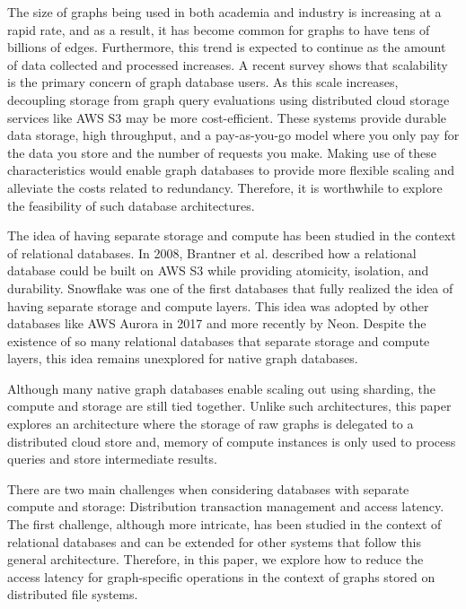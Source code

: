 The size of graphs being used in both academia and industry is increasing at a
rapid rate, and as a result, it has become common for graphs to have tens of
billions of edges\cite{sahu2017ubiquity}. Furthermore, this trend is expected to
continue as the amount of data collected and processed increases. A recent
survey shows that scalability is the primary concern of graph database
users\cite{sahu2017ubiquity}. As this scale
increases, decoupling storage from graph query evaluations using distributed
cloud storage services like AWS S3\cite{awsS3} may be
more cost-efficient. These systems provide durable data storage, high
throughput, and a pay-as-you-go model where you only pay for the data you store
and the number of requests you make. Making use of these characteristics would
enable graph databases to provide more flexible scaling and alleviate 
the costs related to redundancy. Therefore, it is worthwhile to explore
the feasibility of such database architectures.

\medskip
The idea of having separate storage and compute has been studied in the context
of relational databases. In 2008, Brantner et al.\cite{brantner2008building}
described how a relational database could be built on AWS S3 while 
providing atomicity, isolation, and durability. Snowflake\cite{snowflake} was
one of the first databases that fully realized the idea of having
separate storage and compute layers. This idea was adopted by other databases
like AWS Aurora\cite{verbitski2017amazon} in 2017 and more recently by
Neon\cite{neonPostgres}. Despite the existence of so many relational databases
that separate storage and compute layers, this idea remains unexplored for
native graph databases.

\medskip
Although many native graph databases enable scaling out
using sharding\cite{besta2023demystifying}, the compute and storage are
still tied together. Unlike such architectures, this paper explores an
architecture where the storage of raw graphs is delegated to a distributed cloud
store and, memory of compute instances is only used to process queries and store
intermediate results.

\medskip
There are two main challenges when considering databases with separate compute
and storage: Distribution transaction management and access latency. The first
challenge, although more intricate, has been studied in the context of
relational databases\cite{brantner2008building} and can be extended for other
systems that follow this general architecture. Therefore, in this paper, we
explore how to reduce the access latency for graph-specific operations in
the context of graphs stored on distributed file systems.


